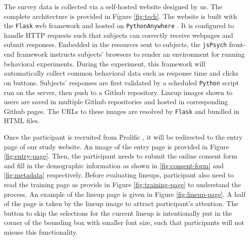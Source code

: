 \documentclass[]{interact}
\theoremstyle{plain}%
\theoremstyle{definition}
\theoremstyle{remark}
\begin{document}
The survey data is collected via a self-hosted website designed by us.
The complete architecture is provided in Figure \ref{fig:tech}. The
website is built with the \texttt{Flask} \citep{flask} web framework and
hosted on \texttt{PythonAnywhere} \citep{pythonanywhere}. It is
configured to handle HTTP requests such that subjects can correctly
receive webpages and submit responses. Embedded in the resources sent to
subjects, the \texttt{jsPsych} front-end framework \citep{jspsych}
instructs subjects' browsers to render an environment for running
behavioral experiments. During the experiment, this framework will
automatically collect common behavioral data such as response time and
clicks on buttons. Subjects' responses are first validated by a
scheduled \texttt{Python} script run on the server, then push to a
Github repository. Lineup images shown to users are saved in multiple
Github repositories and hosted in corresponding Github pages. The URLs
to these images are resolved by \texttt{Flask} and bundled in HTML
files.

Once the participant is recruited from Prolific
\citep{palan2018prolific}, it will be redirected to the entry page of
our study website. An image of the entry page is provided in Figure
\ref{fig:entry-page}. Then, the participant needs to submit the online
consent form and fill in the demographic information as shown in
\ref{fig:consent-form} and \ref{fig:metadata} respectively. Before
evaluating lineups, participant also need to read the training page as
provide in Figure \ref{fig:training-page} to understand the process. An
example of the lineup page is given in Figure \ref{fig:lineup-page}. A
half of the page is taken by the lineup image to attract participant's
attention. The button to skip the selections for the current lineup is
intentionally put in the corner of the bounding box with smaller font
size, such that participants will not misuse this functionality.
\end{document}
